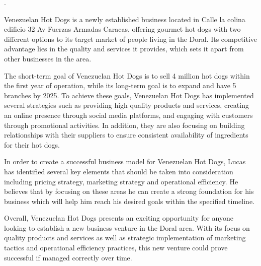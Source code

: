 .

Venezuelan Hot Dogs is a newly established business located in Calle la colina edificio 32 Av Fuerzas Armadas Caracas, offering gourmet hot dogs with two different options to its target market of people living in the Doral. Its competitive advantage lies in the quality and services it provides, which sets it apart from other businesses in the area. 

The short-term goal of Venezuelan Hot Dogs is to sell 4 million hot dogs within the first year of operation, while its long-term goal is to expand and have 5 branches by 2025. To achieve these goals, Venezuelan Hot Dogs has implemented several strategies such as providing high quality products and services, creating an online presence through social media platforms, and engaging with customers through promotional activities. In addition, they are also focusing on building relationships with their suppliers to ensure consistent availability of ingredients for their hot dogs. 

In order to create a successful business model for Venezuelan Hot Dogs, Lucas has identified several key elements that should be taken into consideration including pricing strategy, marketing strategy and operational efficiency. He believes that by focusing on these areas he can create a strong foundation for his business which will help him reach his desired goals within the specified timeline. 

Overall, Venezuelan Hot Dogs presents an exciting opportunity for anyone looking to establish a new business venture in the Doral area. With its focus on quality products and services as well as strategic implementation of marketing tactics and operational efficiency practices, this new venture could prove successful if managed correctly over time.